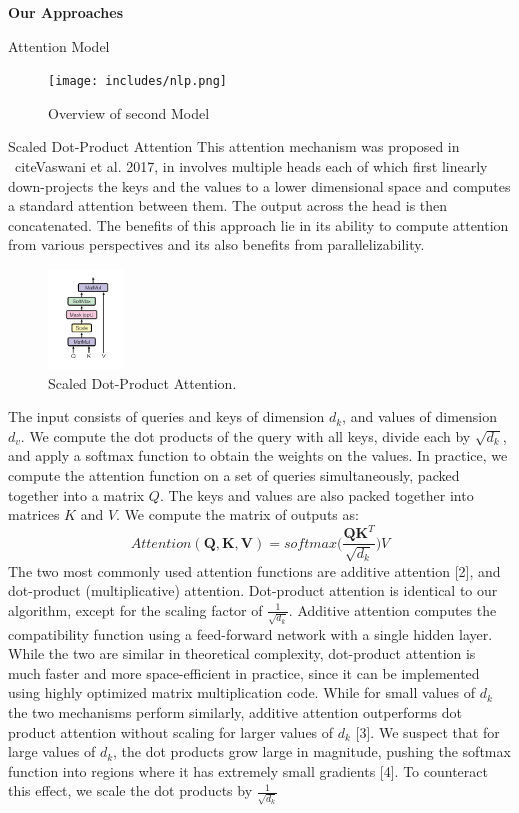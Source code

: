 \documentclass{article}
\def\*#1{\mathbf{#1}}
\begin{document}
\begin{psection}{\textbf{Our Approaches}}
\begin{psubsection}{Attention Model}
\begin{frame}{}
    \begin{figure}[ht!]
		\centering
	    \texttt{[image: includes/nlp.png]}
		\caption{Overview of second Model}
	\end{figure}
\end{frame}

 \begin{subsubsection}{Scaled Dot-Product Attention}
      This attention mechanism was proposed in ~cite{Vaswani et al. 2017}, in involves multiple heads each of which first linearly down-projects the keys and the values to a lower dimensional space and computes a standard attention between them. The output across the head is then concatenated. The benefits of this approach lie in its ability to compute attention from various perspectives and its also benefits from parallelizability.

       \begin{figure}[ht!]
			\centering
			\includegraphics[height=100px]{includes/Attention-Dot.png}
			\caption{Scaled Dot-Product Attention. }
			\label{fig:attention-dot}
		\end{figure}

      The input consists of queries and keys of dimension $d_k$, and values of dimension $d_v$. We compute the dot products of the query with all keys, divide each by $\sqrt{d_k}$, and apply a softmax function to obtain the weights on the values. In practice, we compute the attention function on a set of queries simultaneously,  packed together into a matrix $Q$. The keys and values are also packed together into matrices $K$ and $V$. We compute the matrix of outputs as:
      $$Attention(\*Q, \*K, \*V ) = softmax\Big(\frac{\*Q\*K^T}{\sqrt{d_k}}\Big)V$$
      The two most commonly used attention functions are additive attention [2], and dot-product (multiplicative)
      attention. Dot-product attention is identical to our algorithm, except for the scaling factor of $\frac{1}{\sqrt{d_k}}$. Additive attention computes the compatibility function using a feed-forward network with
      a single hidden layer. While the two are similar in theoretical complexity, dot-product attention is
      much faster and more space-efficient in practice, since it can be implemented using highly optimized
      matrix multiplication code. While for small values of $d_k$ the two mechanisms perform similarly, additive attention outperforms dot product attention without scaling for larger values of $d_k$ [3]. We suspect that for large values of
      $d_k$, the dot products grow large in magnitude, pushing the softmax function into regions where it has
      extremely small gradients [4]. To counteract this effect, we scale the dot products by $\frac{1}{\sqrt{d_k}}$


\end{subsubsection}
\end{psubsection}
\end{psection}
\end{document}
